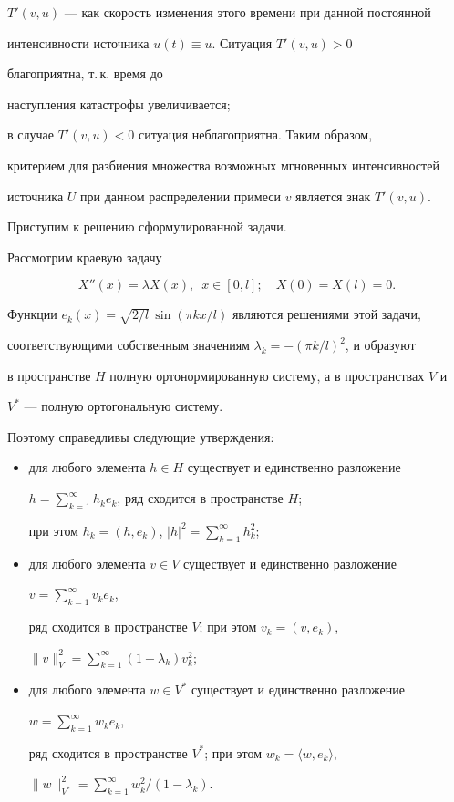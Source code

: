 $T'(v,u)$ --- как скорость изменения этого времени при данной постоянной 


интенсивности источника $u(t)\equiv u$. Ситуация $T'(v,u)>0$


благоприятна, т.\,к.  время до


наступления катастрофы увеличивается;


в случае $T'(v,u)<0$ ситуация неблагоприятна. Таким образом, 


критерием для разбиения множества возможных мгновенных интенсивностей 


источника $U$ при данном распределении примеси $v$ является знак $T'(v,u)$.





Приступим к решению сформулированной задачи.


Рассмотрим краевую задачу


$$


X''(x)=\lambda X(x),\ \; x\in[0,l];\quad X(0)=X(l)=0.


$$


Функции $e_k(x)=\sqrt{2/l}\,\sin(\pi kx/l)$ являются решениями этой задачи,


соответствующими собственным значениям $\lambda_k=-(\pi k/l)^2$, и образуют


в пространстве $H$ полную ортонормированную систему, а в пространствах $V$ и 


$V^*$ --- полную ортогональную систему. 


Поэтому справедливы следующие утверждения:


\begin{itemize}


\item[1)] для любого элемента $h\in H$ существует и единственно разложение


$h= \sum\limits_{k=1}^\infty  h_ke_k$, ряд сходится в пространстве $H$;


при этом $h_k=(h,e_k)$, $|h|^2= \sum\limits_{k=1}^\infty  h_k^2$;


\item[2)] для любого элемента $v\in V$ существует и единственно разложение


$v=\sum\limits_{k=1}^\infty  v_ke_k$,


ряд сходится в пространстве $V$; при этом $v_k=(v,e_k)$,


$\|v\|_V^2= \sum\limits_{k=1}^\infty (1-\lambda_k)v_k^2$;


\item[3)] для любого элемента $w\in V^*$ существует и единственно разложение


$w=\sum\limits_{k=1}^\infty  w_ke_k$,


ряд сходится в пространстве $V^*$; при этом $w_k=\langle w,e_k\rangle$,


$\|w\|_{V^*}^2= \sum\limits_{k=1}^\infty  w_k^2/(1-\lambda_k)$.


\end{itemize}





